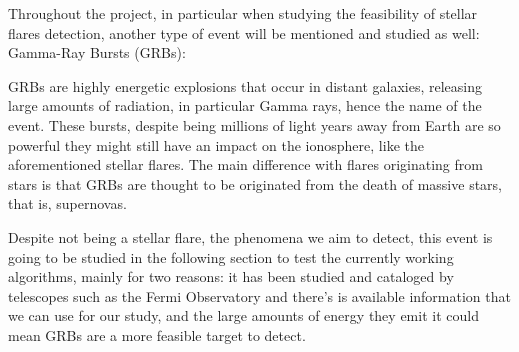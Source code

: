 Throughout the project, in particular when studying the feasibility of stellar flares detection, another type of event will be mentioned and studied as well: Gamma-Ray Bursts (GRBs):

GRBs are highly energetic explosions that occur in distant galaxies, releasing large amounts of radiation, in particular Gamma rays, hence the name of the event. These bursts, despite being millions of light years away from Earth are so powerful they might still have an impact on the ionosphere, like the aforementioned stellar flares. 
The main difference with flares originating from stars is that GRBs are thought to be originated from the death of massive stars, that is, supernovas.

Despite not being a stellar flare, the phenomena we aim to detect, this event is going to be studied in the following section to test the currently working algorithms, mainly for two reasons: it has been studied and cataloged by telescopes such as the Fermi Observatory and there’s is available information that we can use for our study, and the large amounts of energy they emit it could mean GRBs are a more feasible target to detect.